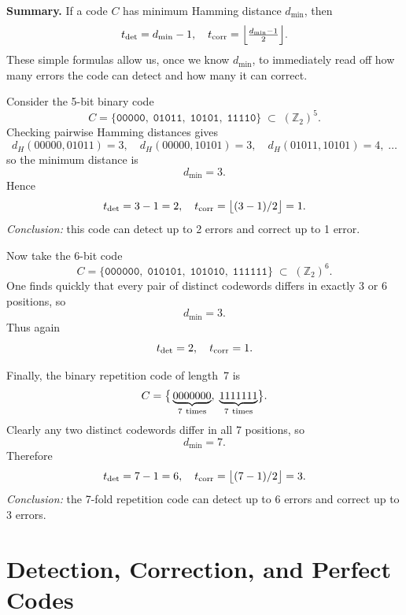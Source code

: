 \documentclass[docmute]{article}
\begin{document}
\medskip

\noindent\textbf{Summary.}  If a code \(C\) has minimum Hamming distance \(d_{\min}\), then
\[
  t_{\rm det} = d_{\min} - 1,
  \quad
  t_{\rm corr} = \Bigl\lfloor \tfrac{d_{\min}-1}{2}\Bigr\rfloor.
\]
These simple formulas allow us, once we know \(d_{\min}\), to immediately read off how many errors the code can detect and how many it can correct.

\begin{example}

\noindent Consider the 5-bit binary code
\[
  C = \bigl\{\texttt{00000},\;\texttt{01011},\;\texttt{10101},\;\texttt{11110}\bigr\}
  \;\subset\;(\mathbb{Z}_2)^5.
\]
Checking pairwise Hamming distances gives
\[
  d_H(00000,01011)=3,\quad
  d_H(00000,10101)=3,\quad
  d_H(01011,10101)=4,\;\ldots
\]
so the minimum distance is
\[
  d_{\min}=3.
\]
Hence
\[
  t_{\rm det}=3-1=2,
  \quad
  t_{\rm corr}=\bigl\lfloor(3-1)/2\bigr\rfloor=1.
\]
\emph{Conclusion:} this code can detect up to 2 errors and correct up to 1 error.
\end{example}

\begin{example}

\noindent Now take the 6-bit code
\[
  C = \bigl\{\texttt{000000},\;\texttt{010101},\;\texttt{101010},\;\texttt{111111}\bigr\}
  \;\subset\;(\mathbb{Z}_2)^6.
\]
One finds quickly that every pair of distinct codewords differs in exactly 3 or 6 positions, so
\[
  d_{\min}=3.
\]
Thus again
\[
  t_{\rm det}=2,
  \quad
  t_{\rm corr}=1.
\]
\end{example}

\begin{example}

\noindent Finally, the binary repetition code of length~7 is
\[
  C = \bigl\{\,\underbrace{0000000}_{7\rm\ times},\;
                 \underbrace{1111111}_{7\rm\ times}\bigr\}.
\]
Clearly any two distinct codewords differ in all 7 positions, so
\[
  d_{\min}=7.
\]
Therefore
\[
  t_{\rm det}=7-1=6,
  \quad
  t_{\rm corr}=\bigl\lfloor(7-1)/2\bigr\rfloor=3.
\]
\emph{Conclusion:} the 7-fold repetition code can detect up to 6 errors and correct up to 3 errors.
\end{example}



\section{Detection, Correction, and Perfect Codes}
\end{document}
